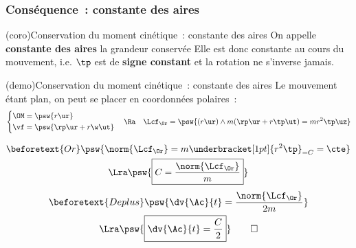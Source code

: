 \documentclass[../../main/main.tex]{subfiles}
\begin{document}
\subsubsection{Conséquence~: constante des aires}
\begin{tcb*}(coro){Conservation du moment cinétique~: constante des aires}
	On appelle \textbf{constante des aires} la grandeur conservée
	\psw{
		\[
			\boxed{C = r^{2}\tp} \Lra \dv{\Ac}{t} = \frac{C}{2}
		\]
	}
	Elle est donc constante au cours du mouvement, i.e. $\tp$ est de \textbf{signe
		constant} et la rotation ne s'inverse jamais.
\end{tcb*}
\begin{tcb*}(demo){Conservation du moment cinétique~: constante des aires}
	Le mouvement étant plan, on peut se placer en coordonnées polaires~:
	\begin{gather*}
		\left\{
		\begin{aligned}
			\OM & = \psw{r\ur}            \\
			\vf & = \psw{\rp\ur + r\w\ut}
		\end{aligned}
		\right.
		\quad\Ra\quad
		\Lcf_{\Or} = \psw{(r\ur)\wedge m(\rp\ur+r\tp\ut) = mr^2\tp\uz}
	\end{gather*}
	\begin{isd}
		\vspace{-15pt}
		\begin{gather*}
			\beforetext{Or}
			\psw{\norm{\Lcf_{\Or}} = m \underbracket[1pt]{r^{2}\tp}_{=C} = \cte}
			\\\Lra
			\psw{\boxed{C = \frac{\norm{\Lcf_{\Or}}}{m}}}
		\end{gather*}
		\tcblower
		\vspace{-15pt}
		\begin{gather*}
			\beforetext{De plus}
			\psw{\dv{\Ac}{t} = \frac{\norm{\Lcf_{\Or}}}{2m}}
			\\\Lra
			\psw{\boxed{\dv{\Ac}{t} = \frac{C}{2}}}
			\qed
		\end{gather*}
	\end{isd}
\end{tcb*}

\end{document}
